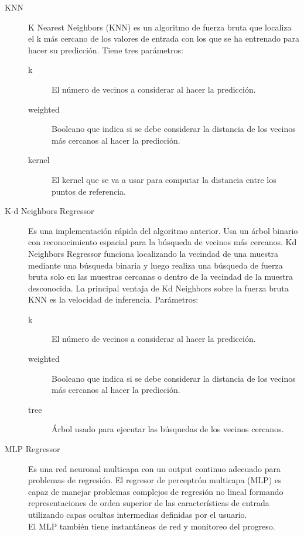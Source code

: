\begin{description}
	\item [KNN] K Nearest Neighbors (KNN) es un algoritmo de fuerza bruta que localiza el k más cercano de los valores de entrada con los que se ha entrenado para hacer su predicción. Tiene tres parámetros:
	\begin{description}
	    \item[k] El número de vecinos a considerar al hacer la predicción.
	    \item[weighted] Booleano que indica si se debe considerar la distancia de los vecinos más cercanos al hacer la predicción.
	    \item[kernel] El kernel que se va a usar para computar la distancia entre los puntos de referencia.
	\end{description}
	\item[K-d Neighbors Regressor] Es una implementación rápida del algoritmo anterior. Usa un árbol binario con reconocimiento espacial para la búsqueda de vecinos más cercanos. Kd Neighbors Regressor funciona localizando la vecindad de una muestra mediante una búsqueda binaria y luego realiza una búsqueda de fuerza bruta solo en las muestras cercanas o dentro de la vecindad de la muestra desconocida.  La principal ventaja de Kd Neighbors sobre la fuerza bruta KNN es la velocidad de inferencia. Parámetros:
	\begin{description}
	    \item[k] El número de vecinos a considerar al hacer la predicción.
	    \item[weighted] Booleano que indica si se debe considerar la distancia de los vecinos más cercanos al hacer la predicción.
	    \item[tree] Árbol usado para ejecutar las búsquedas de los vecinos cercanos.
	\end{description}
	\item [MLP Regressor] Es una red neuronal multicapa con un output continuo adecuado para problemas de regresión.  El regresor de perceptrón multicapa (MLP) es capaz de manejar problemas complejos de regresión no lineal formando representaciones de orden superior de las características de entrada utilizando capas ocultas intermedias definidas por el usuario.\\
	El MLP también tiene instantáneas de red y monitoreo del progreso.
\end{description}




 